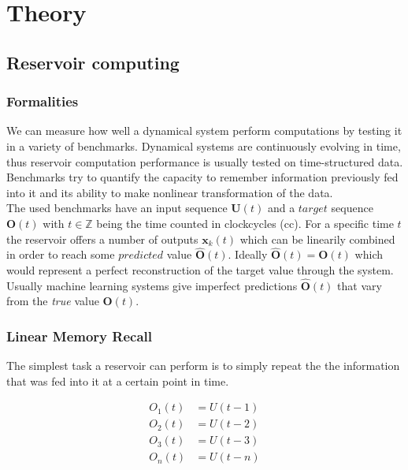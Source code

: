 \section{Theory}

\subsection{Reservoir computing}



	\subsubsection{Formalities}

We can measure how well a dynamical system perform computations by testing it in a variety of benchmarks. Dynamical systems are continuously evolving in time, thus reservoir computation performance is usually tested on time-structured data. Benchmarks try to quantify the capacity to remember information previously fed into it and its ability to make nonlinear transformation of the data.\\ 

The used benchmarks have an input sequence $\textbf{U}(t)$ and a $target$ sequence $\textbf{O}(t)$ with $t \in \mathbb{Z}$ being the time counted in clockcycles (cc). For a specific time $t$ the reservoir offers a number of outputs $\textbf{x}_{k}(t)$ which can be linearily combined in order to reach some $predicted$ value $\hat{\textbf{O}}(t)$. Ideally $\hat{\textbf{O}}(t) = \textbf{O}(t)$ which would represent a perfect reconstruction of the target value through the system. Usually machine learning systems give imperfect predictions $\hat{\textbf{O}}(t)$ that vary from the \emph{true} value $\textbf{O}(t)$.


\subsubsection{Linear Memory Recall}
The simplest task a reservoir can perform is to simply repeat the the information that was fed into it at a certain point in time. 

	\begin{equation}
		\begin{split}
		O_{1}(t) & = U(t - 1) \\
		O_{2}(t) & = U(t - 2) \\				
		O_{3}(t) & = U(t - 3) \\
		O_{n}(t) & = U(t - n)
		\end{split}
		\label{eq:linear_recall_task}
	\end{equation}


